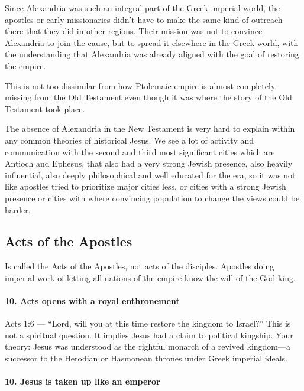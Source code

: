 Since Alexandria was such an integral part of the Greek imperial world, the apostles or early missionaries didn't have to make the same kind of outreach there that they did in other regions.
Their mission was not to convince Alexandria to join the cause, but to spread it elsewhere in the Greek world, with the understanding that Alexandria was already aligned with the goal of restoring the empire.

This is not too dissimilar from how Ptolemaic empire is almost completely missing from the Old Testament even though it was where the story of the Old Testament took place.

The absence of Alexandria in the New Testament is very hard to explain within any common theories of historical Jesus.
We see a lot of activity and communication with the second and third most significant cities which are Antioch and Ephesus, that also had a very strong Jewish presence, also heavily influential, also deeply philosophical and well educated for the era, so it was not like apostles tried to prioritize major cities less, or cities with a strong Jewish presence or cities with where convincing population to change the views could be harder.

\subsection{Acts of the Apostles}\label{par:acts-of-the-apostles}

Is called the Acts of the Apostles, not acts of the disciples.
Apostles doing imperial work of letting all nations of the empire know the will of the God king.

\paragraph{10.
Acts opens with a royal enthronement}\label{par:acts-opens-with-a-royal-enthronement}

Acts 1:6 --- ``Lord, will you at this time restore the kingdom to Israel?'' This is not a spiritual question.
It implies Jesus had a claim to political kingship.
Your theory: Jesus was understood as the rightful monarch of a revived kingdom---a successor to the Herodian or Hasmonean thrones under Greek imperial ideals.

\paragraph{10.
Jesus is taken up like an emperor}\label{par:jesus-is-taken-up-like-an-emperor}

